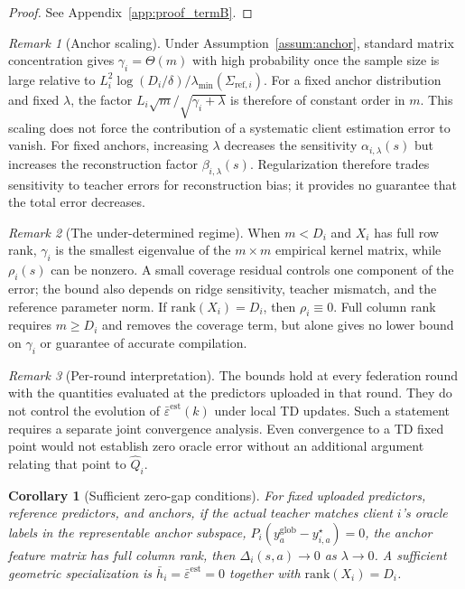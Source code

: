 \documentclass[sigconf,anonymous]{aamas}
\theoremstyle{plain}
\newtheorem{corollary}{Corollary}
\theoremstyle{definition}
\theoremstyle{remark}
\newtheorem{remark}{Remark}
\begin{document}
\begin{proof}
See Appendix~\ref{app:proof_termB}.
\end{proof}

\begin{remark}[Anchor scaling]
\label{rem:m_scaling}
Under Assumption~\ref{assum:anchor}, standard matrix concentration gives
$\gamma_i=\Theta(m)$ with high probability once the sample size is large
relative to
$L_i^2\log(D_i/\delta)/
\lambda_{\min}(\Sigma_{\mathrm{ref},i})$.
For a fixed anchor distribution and fixed $\lambda$, the factor
$L_i\sqrt m/\sqrt{\gamma_i+\lambda}$ is therefore of constant order in
$m$.  This scaling does not force the contribution of a systematic
client estimation error to vanish.  For fixed anchors, increasing
$\lambda$ decreases the sensitivity $\alpha_{i,\lambda}(s)$ but
increases the reconstruction factor $\beta_{i,\lambda}(s)$.
Regularization therefore trades sensitivity to teacher errors for
reconstruction bias; it provides no guarantee that the total error
decreases.
\end{remark}

\begin{remark}[The under-determined regime]
\label{rem:underdetermined}
When $m<D_i$ and $X_i$ has full row rank, $\gamma_i$ is the smallest
eigenvalue of the $m\times m$ empirical kernel matrix, while
$\rho_i(s)$ can be nonzero.  A small coverage residual controls one
component of the error; the bound also depends on ridge sensitivity,
teacher mismatch, and the reference parameter norm.  If
$\mathrm{rank}(X_i)=D_i$, then $\rho_i\equiv0$.  Full column rank
requires $m\ge D_i$ and removes the coverage term, but alone gives no
lower bound on $\gamma_i$ or guarantee of accurate compilation.
\end{remark}

\begin{remark}[Per-round interpretation]
\label{rem:per_round}
The bounds hold at every federation round with the quantities evaluated
at the predictors uploaded in that round.  They do not control the
evolution of $\bar\varepsilon^{\mathrm{est}}(k)$ under local TD updates.
Such a statement requires a separate joint convergence analysis.
Even convergence to a TD fixed point would not establish zero oracle
error without an additional argument relating that point to $\hat Q_i$.
\end{remark}

\begin{corollary}[Sufficient zero-gap conditions]
For fixed uploaded predictors, reference predictors, and anchors,
if the actual teacher matches client $i$'s oracle labels in the
representable anchor subspace,
$P_i(y^{\mathrm{glob}}_a-y^\star_{i,a})=0$, the anchor feature matrix has
full column rank, then $\Delta_i(s,a)\to0$ as $\lambda\to0$.
A sufficient geometric specialization is
$\bar h_i=\bar\varepsilon^{\mathrm{est}}=0$ together with
$\mathrm{rank}(X_i)=D_i$.
\end{corollary}
\end{document}
